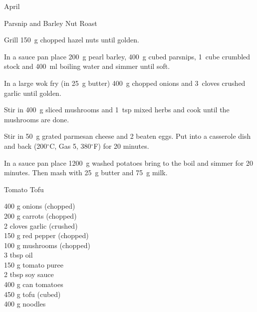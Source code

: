 \begin{menu}{April}
\begin{recipe}{2}{Parsnip and Barley Nut Roast}
	
    \begin{instructions}
    \item 
        Grill 150~g chopped hazel nuts until golden.
      \item 
        In a sauce pan
        place
        200~g  pearl barley,
        400~g cubed parsnips,
        1~cube crumbled stock
        and
        400~ml  boiling water
        and simmer until soft.
      \item 
        In a large wok fry
        (in 25~g  butter)
        400~g chopped onions
        and
        3~cloves crushed garlic
        until golden.
      \item 
        Stir in
        400~g sliced mushrooms
        and
        1~tsp  mixed herbs
        and cook until the mushrooms are done.
      \item 
        Stir in
        50~g grated parmesan cheese
        and
        2 beaten eggs.
        Put into a
        casserole dish
        and back
        (200$^{\circ}$C, Gas 5, 380$^{\circ}$F)
        for 20 minutes.
      \item 
    In a sauce pan place
    1200~g washed potatoes
    bring to the boil and simmer for 20 minutes.
    Then mash with
    25~g  butter
    and
    75~g  milk.
  
    \end{instructions}
    \end{recipe}%
  
    \begin{recipe}{2}{Tomato Tofu}%
		\begin{ingredients}
		400 g onions (chopped) \\
	200 g carrots (chopped) \\
	2 cloves garlic (crushed) \\
	150 g red pepper (chopped) \\
	100 g mushrooms (chopped) \\
	3 tbsp oil  \\
	150 g tomato puree  \\
	2 tbsp soy sauce  \\
	400 g can tomatoes  \\
	450 g tofu (cubed) \\
	400 g noodles  \\
	
		\end{ingredients}
	

\end{recipe}
\end{menu}
